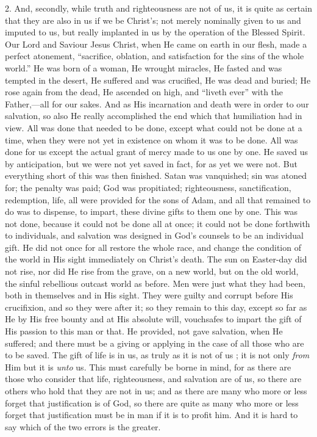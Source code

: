 2. And, secondly, while truth and righteousness are not of us, it
is quite as certain that they are also in us if we be Christ's; not
merely nominally given to us and imputed to us, but really implanted
in us by the operation of the Blessed Spirit. Our Lord and Saviour
Jesus Christ, when He came on earth in our flesh, made a perfect
atonement, ``sacrifice, oblation, and satisfaction for the sins of
the whole world.'' He was born of a woman, He wrought miracles, He
fasted and was tempted in the desert, He suffered and was crucified,
He was dead and buried; He rose again from the dead, He ascended on
high, and ``liveth ever'' with the Father,—all for our
sakes. And as His incarnation and death were in order to our
salvation, so also He really accomplished the end which that
humiliation had in view. All was done that needed to be done, except
what could not be done at a time, when they were not yet in existence
on whom it was to be done. All was done for us except the actual grant
of mercy made to us one by one. He saved us by anticipation, but we
were not yet saved in fact, for as yet we were not. But everything
short of this was then finished. Satan was vanquished; sin was atoned
for; the penalty was paid; God was propitiated; righteousness,
sanctification, redemption, life, all were provided for the sons of
Adam, and all that remained to do was to dispense, to impart, these
divine gifts to them one by one. This was not done, because it could
not be done all at once; it could not be done forthwith to
individuals, and salvation was designed in God's counsels to be an
individual gift. He did not once for all restore the whole race, and
change the condition of the world in His sight immediately on Christ's
death. The sun on Easter-day did not rise, nor did He rise from the
grave, on a new world, but on the old world, the sinful rebellious
outcast world as before. Men were just what they had been, both in
themselves and in His sight. They were guilty and corrupt before His
crucifixion, and so they were after it; so they remain to this day,
except so far as He by His free bounty and at His absolute will,
vouchsafes to impart the gift of His passion to this man or that. He
provided, not gave salvation, when He suffered; and there must be a
giving or applying in the case of all those who are to be saved. The
gift of life is in us, as truly as it is not of us ; it is not only \emph{from}
Him but it is \emph{unto} us. This must carefully be borne in mind,
for as there are those who consider that life, righteousness, and
salvation are of us, so there are others who hold that they are not in
us; and as there are many who more or less forget that justification
is of God, so there are quite as many who more or less forget that
justification must be in man if it is to profit him. And it is hard to
say which of the two errors is the greater.

